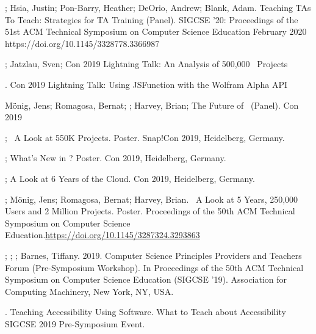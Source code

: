 \begin{etaremune}
    \item{\me; Hsia, Justin; Pon-Barry, Heather; DeOrio, Andrew; Blank, Adam. Teaching TAs To Teach: Strategies for TA Training (Panel). SIGCSE '20: Proceedings of the 51st ACM Technical Symposium on Computer Science Education February 2020
    \newline
    https://doi.org/10.1145/3328778.3366987}

    
    \item{\me; Jatzlau, Sven; \snap{}Con 2019 Lightning Talk: An Analysis of 500,000 \snap\ Projects}
    
    \item{\me. \snap{}Con 2019 Lightning Talk: Using JSFunction with the Wolfram Alpha API}
    
    \item{Mönig, Jens; Romagosa, Bernat; \me; Harvey, Brian; The Future of \snap\ (Panel). \snap Con 2019}
    
    
    \item{\me; \snap\ A Look at 550K Projects. Poster. Snap!Con 2019, Heidelberg, Germany.}
    
    \item{\me; What's New in ? Poster. \snap{}Con 2019, Heidelberg, Germany.}
    
    \item{\me; A Look at 6 Years of the \snap{}Cloud. \snap{}Con 2019, Heidelberg, Germany.}
    
    
    \item{\me; Mönig, Jens; Romagosa, Bernat; Harvey, Brian. \snap\ A Look at 5 Years, 250,000 Users and 2 Million Projects. Poster. Proceedings of the 50th ACM Technical Symposium on Computer Science Education.\newline\href{https://doi.org/10.1145/3287324.3293863}{https://doi.org/10.1145/3287324.3293863}}
    
    \item{\lauren; \me; \dan; Barnes, Tiffany. 2019. Computer Science Principles Providers and Teachers Forum (Pre-Symposium Workshop). In Proceedings of the 50th ACM Technical Symposium on Computer Science Education (SIGCSE '19). Association for Computing Machinery, New York, NY, USA.}
    
    \item{\me. Teaching Accessibility Using Software. What to Teach about Accessibility SIGCSE 2019 Pre-Symposium Event.}
    

\end{etaremune}
